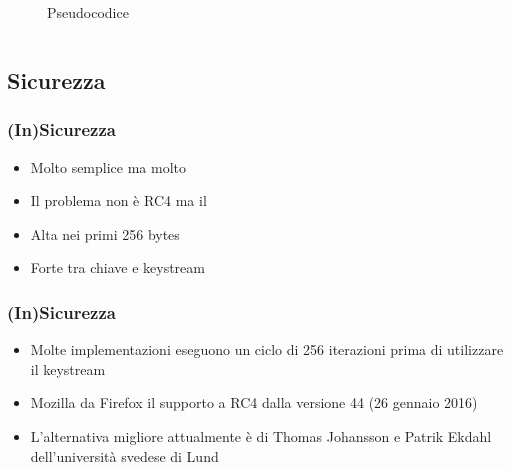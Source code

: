 \begin{frame}
\begin{columns}
\begin{column}{0.35\textwidth}
\begin{center}
\begin{figure}
							\caption{Pseudocodice}
						\end{figure}
					\end{center}
				\end{column}
			\end{columns}	
		\end{frame}
	
	\subsection{Sicurezza}
		
		\begin{frame}
			\frametitle{(In)Sicurezza}	
			\begin{itemize}
				\item Molto semplice ma molto 
				\item Il problema non è RC4 ma il 
				\item Alta  nei primi 256 bytes
				\item Forte  tra chiave e keystream
			\end{itemize}
		\end{frame}
	
		\begin{frame}
			\frametitle{(In)Sicurezza}	
			\begin{itemize}
				\item Molte implementazioni eseguono un ciclo di 256 iterazioni  prima di utilizzare il keystream
				\item Mozilla  da Firefox il supporto a RC4 dalla versione 44 (26 gennaio 2016)
				\item L'alternativa migliore attualmente è  di Thomas Johansson e Patrik Ekdahl dell'università svedese di Lund
			\end{itemize}
		\end{frame}


